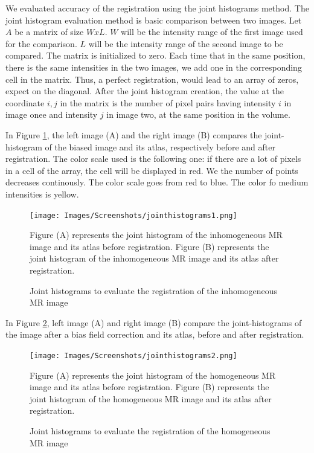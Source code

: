 We evaluated accuracy of the registration using the joint histograms method.
The joint histogram evaluation method is basic comparison between two images. Let $A$ be a matrix of size $WxL$. $W$ will be the intensity range of the first image used for the comparison. $L$ will be the intensity range of the second image to be compared. The matrix is initialized to zero. Each time that in the same position, there is the same intensities in the two images, we add one in the corresponding cell in the matrix. Thus, a perfect registration, would lead to an array of zeros, expect on the diagonal.
After the joint histogram creation, the value at the coordinate ${i,j}$ in the matrix is the number of pixel pairs having intensity $i$ in image onee and intensity $j$ in image two, at the same position in the volume.
\par
In Figure \ref{fig:joint1}, the left image (A) and the right image (B) compares the joint-histogram of the biased image and its atlas, respectively before and after registration.  The color scale used is the following one: if there are a lot of pixels in a cell of the array, the cell will be displayed in red. We the number of points decreases continously. The color scale goes from red to blue. The color fo medium intensities is yellow.

\begin{figure}\centering
  \texttt{[image: Images/Screenshots/jointhistograms1.png]}
  \caption{Joint histograms to evaluate the registration of the inhomogeneous MR image}{Figure (A) represents the joint histogram of the inhomogeneous MR image and its atlas before registration. Figure (B) represents the joint histogram of the inhomogeneous MR image and its atlas after registration.}\label{fig:joint1}
\end{figure}


In Figure \ref{fig:joint2}, left image (A) and right image (B) compare the joint-histograms of the image after a bias field correction and its atlas, before and after registration.

\begin{figure}\centering
  \texttt{[image: Images/Screenshots/jointhistograms2.png]}
  \caption{Joint histograms to evaluate the registration of the homogeneous MR image}{Figure (A) represents the joint histogram of the homogeneous MR image and its atlas before registration. Figure (B) represents the joint histogram of the homogeneous MR image and its atlas after registration.}\label{fig:joint2}
\end{figure}

